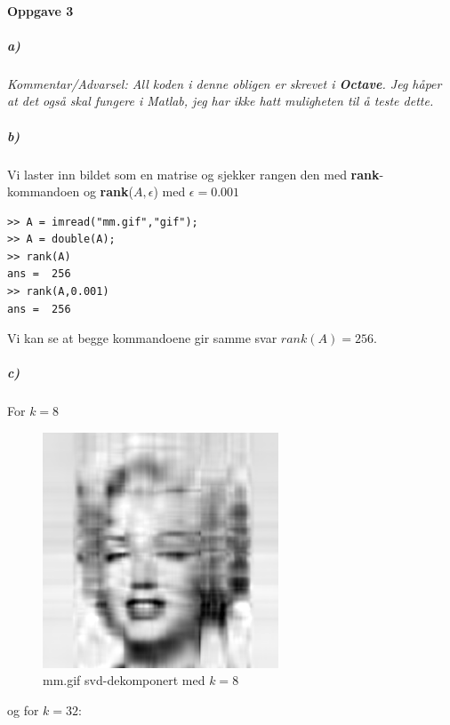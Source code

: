 \documentclass[a4paper,norsk, 10pt]{article}
\begin{document}
\paragraph*{Oppgave 3}

\subparagraph*{a)}

\hspace{5mm}

\textit{Kommentar/Advarsel: All koden i denne obligen er skrevet i \textbf{Octave}. Jeg håper at det også skal fungere i Matlab, jeg har ikke hatt muligheten til å teste dette.}\\



\subparagraph*{b)}

Vi laster inn bildet som en matrise og sjekker rangen den med \textbf{rank}-kommandoen og \textbf{rank}($A,\epsilon$) med $\epsilon = 0.001$

\begin{verbatim}
>> A = imread("mm.gif","gif");
>> A = double(A);
>> rank(A)
ans =  256
>> rank(A,0.001)
ans =  256
\end{verbatim}

Vi kan se at begge kommandoene gir samme svar $rank(A) = 256$.

\subparagraph*{c)}

For $k = 8$

\begin{figure}[H]
\begin{center}
\includegraphics[width = 70mm]{k8.png}
\caption{mm.gif svd-dekomponert med $k=8$}
\end{center}
\end{figure}

og for $k = 32$:
\end{document}
